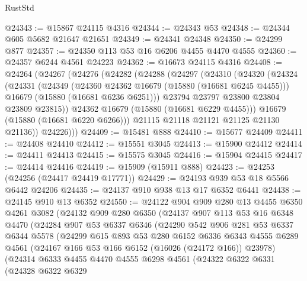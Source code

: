 \begin{lexlean}{RustStd}
\begin{coremodule}
@24343 := @15867 @24115 @4316
@24344 := @24343 @53
@24348 := @24344 @605 @5682 @21647 @21651
@24349 := @24341 @24348
@24350 := @24299 @877
@24357 := @24350 @113 @53 @16 @6206 @4455 @4470 @4555
@24360 := @24357 @6244 @4561 @24223
@24362 := @16673 @24115 @4316
@24408 := @24264
    (@24267
      (@24276
        (@24282
          (@24288
            (@24297
              (@24310
                (@24320
                  (@24324
                    (@24331
                      (@24349
                        (@24360 @24362 @16679 (@15880 (@16681 @6245 @4455)))
                        @16679
                        (@15880 (@16681 @6236 @6251)))
                      @23794
                      @23797
                      @23800
                      @23804
                      @23809
                      @23815))
                  @24362
                  @16679
                  (@15880 (@16681 @6229 @4455)))
                @16679
                (@15880 (@16681 @6220 @6266)))
              @21115
              @21118
              @21121
              @21125
              @21130
              @21136))
          @24226)))
@24409 := @15481 @888
@24410 := @15677 @24409
@24411 := @24408 @24410
@24412 := @15551 @3045
@24413 := @15900 @24412
@24414 := @24411 @24413
@24415 := @15575 @3045
@24416 := @15904 @24415
@24417 := @24414 @24416
@24419 := @15909 (@15911 @888)
@24423 := @24253 (@24256 (@24417 @24419 @17771))
@24429 := @24193 @939 @53 @18 @5566 @6442 @24206
@24435 := @24137 @910 @938 @13 @17 @6352 @6441
@24438 := @24145 @910 @13 @6352
@24550 := @24122
    @904
    @909
    @280
    @13
    @4455
    @6350
    @4261
    @3082
    (@24132
      @909
      @280
      @6350
      (@24137
        @907
        @113
        @53
        @16
        @6348
        @4470
        (@24284
          @907
          @53
          @6337
          @6346
          (@24290
            @542
            @906
            @281
            @53
            @6337
            @6344
            @5578
            (@24299
              @615
              @893
              @53
              @280
              @6152
              @6336
              @6343
              @4555
              @6289
              @4561
              (@24167 @166 @53 @166 @6152 (@16026 (@24172 @166)) @23978)
              (@24314
                @6333
                @4455
                @4470
                @4555
                @6298
                @4561
                (@24322
                  @6322
                  @6331
                  (@24328
                    @6322
                    @6329

\end{coremodule}
\end{lexlean}
